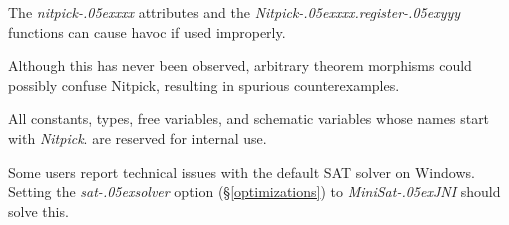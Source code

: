 \documentclass[a4paper,12pt]{article}
\renewcommand\_{\hbox{\textunderscore\kern-.05ex}}
\begin{document}
\begin{enum}
\item[\labelitemi] The \textit{nitpick\_xxx} attributes and the
\textit{Nitpick\_xxx.register\_yyy} functions can cause havoc if used
improperly.

\item[\labelitemi] Although this has never been observed, arbitrary theorem
morphisms could possibly confuse Nitpick, resulting in spurious counterexamples.

\item[\labelitemi] All constants, types, free variables, and schematic variables
whose names start with \textit{Nitpick}{.} are reserved for internal use.

\item[\labelitemi] Some users report technical issues with the default SAT
solver on Windows. Setting the \textit{sat\_solver} option
(\S\ref{optimizations}) to \textit{MiniSat\_JNI} should solve this.
\end{enum}

\let\em=\sl
{}

\end{document}
